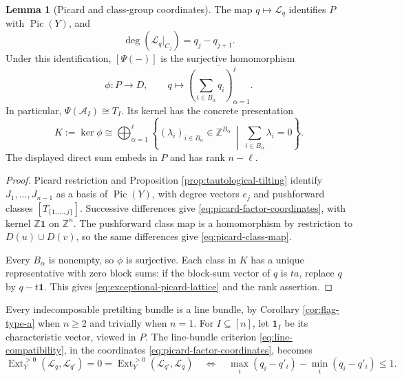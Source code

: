 \documentclass[a4paper,reqno]{amsart}
\DeclareMathOperator{\Ext}{Ext}
\DeclareMathOperator{\Pic}{Pic}
\theoremstyle{definition}
\newtheorem{Lem}[Thm]{Lemma}
\begin{document}
\begin{Lem}[Picard and class-group coordinates]\label{lem:picard-class-map}
The map $q\mapsto\mathcal L_q$ identifies $P$ with $\Pic(Y)$, and
\begin{equation}\label{eq:picard-factor-coordinates}
\deg(\mathcal L_q|_{C_j})=q_j-q_{j+1}.
\end{equation}
Under this identification, $[\Psi(-)]$ is the surjective homomorphism
\begin{equation}\label{eq:picard-class-map}
\phi\colon P\longrightarrow D,\qquad
q\longmapsto
\overline{\left(\sum_{i\in B_\alpha}q_i\right)_{\alpha=1}^\ell}.
\end{equation}
In particular, $\Psi(\mathcal A_I)\cong T_I$. Its kernel has the concrete presentation
\begin{equation}\label{eq:exceptional-picard-lattice}
K:=\ker\phi
\cong\bigoplus_{\alpha=1}^\ell
\left\{(\lambda_i)_{i\in B_\alpha}\in\mathbb Z^{B_\alpha}
\ \middle|\ \sum_{i\in B_\alpha}\lambda_i=0\right\}.
\end{equation}
The displayed direct sum embeds in $P$ and has rank $n-\ell$.
\end{Lem}
\begin{proof}
Picard restriction and Proposition \ref{prop:tautological-tilting} identify $J_1,\ldots,J_{n-1}$ as a basis of $\Pic(Y)$, with degree vectors $e_j$ and pushforward classes $[T_{\{1,\ldots,j\}}]$. Successive differences give \eqref{eq:picard-factor-coordinates}, with kernel $\mathbb Z\mathbf1$ on $\mathbb Z^n$. The pushforward class map is a homomorphism by restriction to $D(u)\cup D(v)$, so the same differences give \eqref{eq:picard-class-map}.

Every $B_\alpha$ is nonempty, so $\phi$ is surjective. Each class in $K$ has a unique representative with zero block sums: if the block-sum vector of $q$ is $ta$, replace $q$ by $q-t\mathbf1$. This gives \eqref{eq:exceptional-picard-lattice} and the rank assertion.
\end{proof}

Every indecomposable pretilting bundle is a line bundle, by Corollary \ref{cor:flag-type-a} when $n\ge2$ and trivially when $n=1$. For $I\subseteq[n]$, let $\mathbf1_I$ be its characteristic vector, viewed in $P$. The line-bundle criterion \eqref{eq:line-compatibility}, in the coordinates \eqref{eq:picard-factor-coordinates}, becomes
\begin{equation}\label{eq:factor-line-compatibility}
\Ext_Y^{>0}(\mathcal L_q,\mathcal L_{q'})=0
=\Ext_Y^{>0}(\mathcal L_{q'},\mathcal L_q)
\quad\Longleftrightarrow\quad
\max_i(q_i-q'_i)-\min_i(q_i-q'_i)\le1.
\end{equation}
\end{document}
